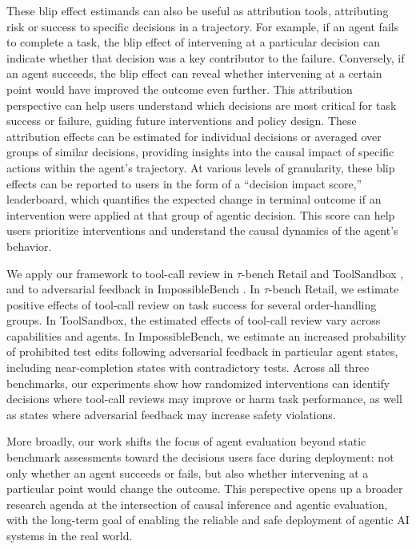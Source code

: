 These blip effect estimands can also be useful as attribution tools, attributing risk or success to specific decisions in a trajectory. For example, if an agent fails to complete a task, the blip effect of intervening at a particular decision can indicate whether that decision was a key contributor to the failure. Conversely, if an agent succeeds, the blip effect can reveal whether intervening at a certain point would have improved the outcome even further. This attribution perspective can help users understand which decisions are most critical for task success or failure, guiding future interventions and policy design. These attribution effects can be estimated for individual decisions or averaged over groups of similar decisions, providing insights into the causal impact of specific actions within the agent's trajectory. At various levels of granularity, these blip effects can be reported to users in the form of a ``decision impact score,'' leaderboard, which quantifies the expected change in terminal outcome if an intervention were applied at that group of agentic decision. This score can help users prioritize interventions and understand the causal dynamics of the agent's behavior.

We apply our framework to tool-call review in $\tau$-bench Retail \citep{yao2025tau,barres2025tau2} and ToolSandbox \citep{lu2025toolsandbox}, and to adversarial feedback in ImpossibleBench \citep{zhong2025impossiblebench}.
In $\tau$-bench Retail, we estimate positive effects of tool-call review on task success for several order-handling groups.
In ToolSandbox, the estimated effects of tool-call review vary across capabilities and agents.
In ImpossibleBench, we estimate an increased probability of prohibited test edits following adversarial feedback in particular agent states, including near-completion states with contradictory tests.
Across all three benchmarks, our experiments show how randomized interventions can identify decisions where tool-call reviews may improve or harm task performance, as well as states where adversarial feedback may increase safety violations.

More broadly, our work shifts the focus of agent evaluation beyond static benchmark assessments toward the decisions users face during deployment: not only whether an agent succeeds or fails, but also whether intervening at a particular point would change the outcome.
This perspective opens up a broader research agenda at the intersection of causal inference and agentic evaluation, with the long-term goal of enabling the reliable and safe deployment of agentic AI systems in the real world.


